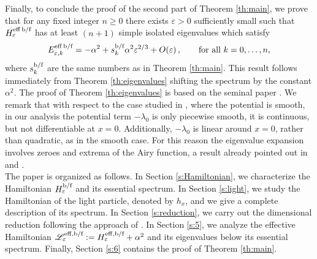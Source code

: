 \documentclass[a4paper,11pt,reqno]{amsart}
\theoremstyle{definition}
\numberwithin{equation}{section}
\newcommand{\BB}{\mathcal B}
\newcommand{\QQ}{\mathcal Q}
\newcommand{\Lscr}{\mathscr{L}}
\newcommand{\ve}{\varepsilon}
\newcommand{\eff}{\mathrm{eff}}
\newcommand{\bof}{\text{\rm b/f}}
\newcommand{\bos}{\text{\rm b}}
\newcommand{\fer}{\text{\rm f}}
\newcommand{\eigenvalueH}{E}
\begin{document}
Finally, to conclude the proof of the second part of Theorem \ref{th:main}, we prove that for any  fixed  integer $n\geq0$ there exists $\ve>0$ sufficiently small such that $H^{\eff\, \bos/\fer}_{\ve}$ has at least $(n+1)$  simple isolated eigenvalues which satisfy 
\[
            \eigenvalueH^{\eff\, \bos/\fer}_{\ve, k} = -\alpha^2 + s^{\bos/\fer }_{k}\alpha^2 \ve^{2/3} + O (\ve)  \, , \qquad \text{for all }k=0,\dots, n,
\]
where $s^{\bof}_{k}$ are the same numbers as in Theorem \ref{th:main}. This result follows immediately from Theorem \ref{th:eigenvalues} shifting the spectrum by the constant $\alpha^2$. The proof of Theorem \ref{th:eigenvalues} is based on the seminal paper \cite{Sim}. We remark that with  respect to the case studied in \cite{Sim}, where the potential is smooth, in our analysis the potential term $-\lambda_0$ is only piecewise smooth, it is continuous, but not differentiable at  $x=0$. Additionally,  $-\lambda_0$ is linear around $x=0$, rather than quadratic, as in the smooth case. For this reason the eigenvalue expansion involves zeroes and extrema of the Airy function, a result already pointed out in \cite{AT1} and \cite{DucheneRaymond14}.  %
\\

The paper  is organized as follows. In Section \ref{s:Hamiltonian}, we characterize the Hamiltonian $H^{\bof}_\ve$ and its essential spectrum. In Section \ref{s:light}, we study the Hamiltonian of the light particle, denoted by $h_x$, and we give a complete description of its spectrum. In Section \ref{s:reduction}, we carry out the dimensional reduction following the approach of \cite{Krejcirik-etal-m2018}. In Section \ref{s:5}, we analyze the effective Hamiltonian $\Lscr^{\eff,\bof}_\ve := H^{\eff,\bof}_\ve + \alpha^2$ and its eigenvalues below its essential spectrum. Finally, Section \ref{s:6} contains the proof of Theorem \ref{th:main}.




\end{document}
